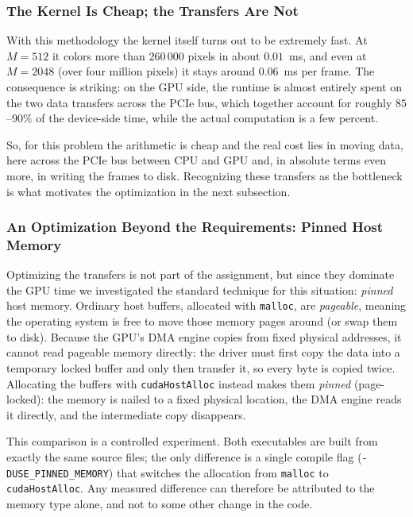 \subsubsection{The Kernel Is Cheap; the Transfers Are Not}

With this methodology the kernel itself turns out to be extremely fast. At
$M=512$ it colors more than $260\,000$ pixels in about $0.01$~ms, and even at
$M=2048$ (over four million pixels) it stays around $0.06$~ms per frame. The
consequence is striking: on the GPU side, the runtime is almost entirely spent on
the two data transfers across the PCIe bus, which together account for roughly
$85$--$90\%$ of the device-side time, while the actual computation is a few
percent.

So, for this problem the arithmetic is cheap and the real cost lies in moving data, here across the PCIe bus between CPU and GPU and, in absolute terms even more, in writing the frames to disk. Recognizing these transfers as the bottleneck is what motivates the optimization in the next subsection.

\subsubsection{An Optimization Beyond the Requirements: Pinned Host Memory}
\label{sec:cuda-pinned}

Optimizing the transfers is not part of the assignment, but since they dominate
the GPU time we investigated the standard technique for this situation:
\emph{pinned} host memory. Ordinary host buffers, allocated with \texttt{malloc},
are \emph{pageable}, meaning the operating system is free to move those memory
pages around (or swap them to disk). Because the GPU's DMA engine copies from
fixed physical addresses, it cannot read pageable memory directly: the driver
must first copy the data into a temporary locked buffer and only then transfer
it, so every byte is copied twice. Allocating the buffers with
\texttt{cudaHostAlloc} instead makes them \emph{pinned} (page-locked): the memory
is nailed to a fixed physical location, the DMA engine reads it directly, and the
intermediate copy disappears.

This comparison is a controlled experiment. Both executables are built from
exactly the same source files; the only difference is a single compile flag
(\texttt{-DUSE\_PINNED\_MEMORY}) that switches the allocation from \texttt{malloc}
to \texttt{cudaHostAlloc}. Any measured difference can therefore be attributed to
the memory type alone, and not to some other change in the code.

